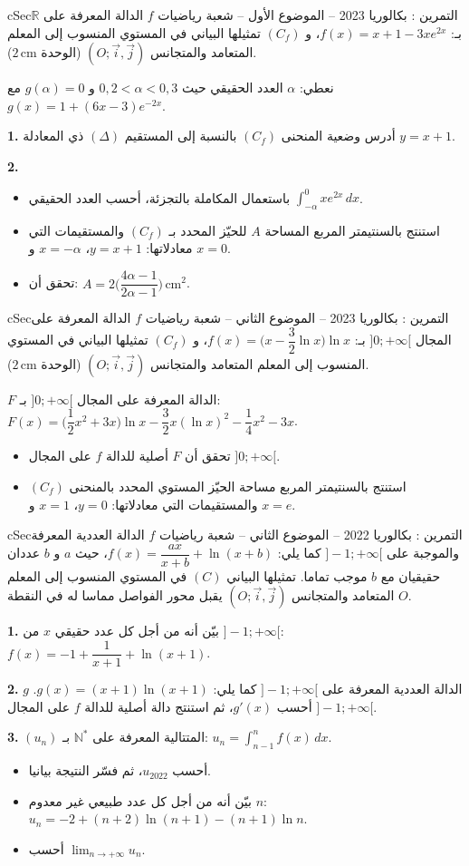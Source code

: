 \documentclass[12pt,a4paper]{article}
\newenvironment{BOX}[2]{\begin{otherlanguage}{english}\begin{arbox}{#1}{#2}}{\end{arbox}\end{otherlanguage}}
\newcounter{exo}
\newenvironment{tamrin}[1]{\stepcounter{exo}\begin{BOX}{cSec}{التمرين \theexo: #1}}{\end{BOX}}
\newcommand{\N}{\mathbb{N}}
\newcommand{\R}{\mathbb{R}}
\newcommand{\limn}{\displaystyle\lim_{n\to+\infty}}
\newenvironment{sq}{\begin{itemize}[leftmargin=2.4em,itemsep=3pt]}{\end{itemize}}
\newcommand{\qa}{\item[(أ)]}\newcommand{\qb}{\item[(ب)]}\newcommand{\qc}{\item[(جـ)]}\newcommand{\qd}{\item[(د)]}\newcommand{\qe}{\item[(هـ)]}
\newcommand{\QQ}[1]{\par\smallskip\textbf{#1.} }
\begin{document}
\begin{tamrin}{بكالوريا 2023 -- الموضوع الأول -- شعبة رياضيات}
$f$ الدالة المعرفة على $\R$ بـ: $f(x)=x+1-3xe^{2x}$، و $(C_f)$ تمثيلها البياني في المستوي المنسوب إلى المعلم المتعامد والمتجانس $(O;\vec i,\vec j)$ (الوحدة $2\,\text{cm}$).

نعطي: $\alpha$ العدد الحقيقي حيث $0{,}2<\alpha<0{,}3$ و $g(\alpha)=0$ مع $g(x)=1+(6x-3)e^{-2x}$.
\QQ{1} أدرس وضعية المنحنى $(C_f)$ بالنسبة إلى المستقيم $(\Delta)$ ذي المعادلة $y=x+1$.
\QQ{2}
\begin{sq}
\qa باستعمال المكاملة بالتجزئة، أحسب العدد الحقيقي $\displaystyle\int_{-\alpha}^0xe^{2x}\,dx$.
\qb استنتج بالسنتيمتر المربع المساحة $A$ للحيّز المحدد بـ $(C_f)$ والمستقيمات التي معادلاتها: $y=x+1$، $x=-\alpha$ و $x=0$.
\qc تحقق أن: $A=2\Big(\dfrac{4\alpha-1}{2\alpha-1}\Big)\,\text{cm}^2$.
\end{sq}
\end{tamrin}

\begin{tamrin}{بكالوريا 2023 -- الموضوع الثاني -- شعبة رياضيات}
$f$ الدالة المعرفة على المجال $]0;+\infty[$ بـ: $f(x)=\Big(x-\dfrac32\ln x\Big)\ln x$، و $(C_f)$ تمثيلها البياني في المستوي المنسوب إلى المعلم المتعامد والمتجانس $(O;\vec i,\vec j)$ (الوحدة $2\,\text{cm}$).

$F$ الدالة المعرفة على المجال $]0;+\infty[$ بـ: $F(x)=\Big(\dfrac12x^2+3x\Big)\ln x-\dfrac32x(\ln x)^2-\dfrac14x^2-3x$.
\begin{sq}
\qa تحقق أن $F$ أصلية للدالة $f$ على المجال $]0;+\infty[$.
\qb استنتج بالسنتيمتر المربع مساحة الحيّز المستوي المحدد بالمنحنى $(C_f)$ والمستقيمات التي معادلاتها: $y=0$، $x=1$ و $x=e$.
\end{sq}
\end{tamrin}

\begin{tamrin}{بكالوريا 2022 -- الموضوع الثاني -- شعبة رياضيات}
$f$ الدالة العددية المعرفة والموجبة على $]-1;+\infty[$ كما يلي: $f(x)=\dfrac{ax}{x+b}+\ln(x+b)$، حيث $a$ و $b$ عددان حقيقيان مع $b$ موجب تماما. تمثيلها البياني $(C)$ في المستوي المنسوب إلى المعلم المتعامد والمتجانس $(O;\vec i,\vec j)$ يقبل محور الفواصل مماسا له في النقطة $O$.
\QQ{1} بيّن أنه من أجل كل عدد حقيقي $x$ من $]-1;+\infty[$: $f(x)=-1+\dfrac{1}{x+1}+\ln(x+1)$.
\QQ{2} $g$ الدالة العددية المعرفة على $]-1;+\infty[$ كما يلي: $g(x)=(x+1)\ln(x+1)$. أحسب $g'(x)$، ثم استنتج دالة أصلية للدالة $f$ على المجال $]-1;+\infty[$.
\QQ{3} $(u_n)$ المتتالية المعرفة على $\N^*$ بـ: $u_n=\displaystyle\int_{n-1}^nf(x)\,dx$.
\begin{sq}
\qa أحسب $u_{2022}$، ثم فسّر النتيجة بيانيا.
\qb بيّن أنه من أجل كل عدد طبيعي غير معدوم $n$: $u_n=-2+(n+2)\ln(n+1)-(n+1)\ln n$.
\qc أحسب $\limn u_n$.
\end{sq}
\end{tamrin}
\end{document}
